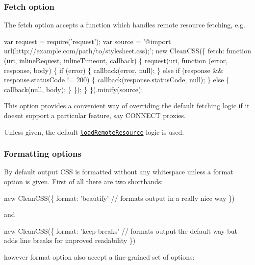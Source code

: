 \subsubsection*{Fetch option}

The {\ttfamily fetch} option accepts a function which handles remote resource fetching, e.\+g.


\begin{DoxyCode}
var request = require('request');
var source = '@import url(http://example.com/path/to/stylesheet.css);';
new CleanCSS(\{
  fetch: function (uri, inlineRequest, inlineTimeout, callback) \{
    request(uri, function (error, response, body) \{
      if (error) \{
        callback(error, null);
      \} else if (response && response.statusCode != 200) \{
        callback(response.statusCode, null);
      \} else \{
        callback(null, body);
      \}
    \});
  \}
\}).minify(source);
\end{DoxyCode}


This option provides a convenient way of overriding the default fetching logic if it doesn\textquotesingle{}t support a particular feature, say C\+O\+N\+N\+E\+CT proxies.

Unless given, the default \href{https://github.com/jakubpawlowicz/clean-css/blob/master/lib/reader/load-remote-resource.js}{\tt load\+Remote\+Resource} logic is used.

\subsubsection*{Formatting options}

By default output C\+SS is formatted without any whitespace unless a {\ttfamily format} option is given. First of all there are two shorthands\+:


\begin{DoxyCode}
new CleanCSS(\{
  format: 'beautify' // formats output in a really nice way
\})
\end{DoxyCode}


and


\begin{DoxyCode}
new CleanCSS(\{
  format: 'keep-breaks' // formats output the default way but adds line breaks for improved readability
\})
\end{DoxyCode}


however {\ttfamily format} option also accept a fine-\/grained set of options\+:

